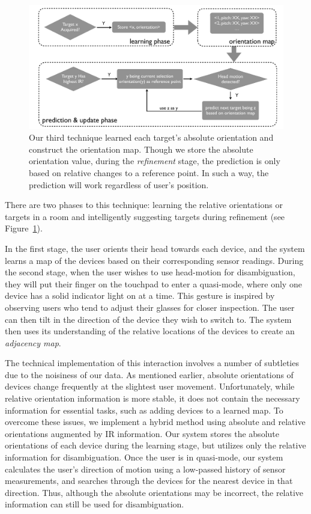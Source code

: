 \begin{figure}[t]
\centering
\includegraphics[width=1\columnwidth]{figures/third_technique3.pdf}
\caption{ Our third technique learned each target's absolute orientation and construct the orientation map. Though we store the absolute orientation value, during the {\em refinement} stage, the prediction is only based on relative changes to a reference point. In such a way, the prediction will work regardless of user's position.}
\label{fig:third_technique}
\end{figure}

There are two phases to this technique: learning the relative orientations or
targets in a room and intelligently suggesting targets during refinement (see
Figure~\ref{fig:third_technique}).

In the first stage, the user orients their head towards each device, and the
system learns a map of the devices based on their corresponding sensor readings.
During the second stage, when the user wishes to use head-motion for
disambiguation, they will put their finger on the touchpad to enter a
quasi-mode, where only one device has a solid indicator light on at a time. This
gesture is inspired by observing users who tend to adjust their glasses for
closer inspection. The user can then tilt in the direction of the device they
wish to switch to. The system then uses its understanding of the relative
locations of the devices to create an {\em adjacency map}.

The technical implementation of this interaction involves a number of subtleties
due to the noisiness of our data. As mentioned earlier, absolute orientations
of devices change frequently at the slightest user movement. Unfortunately,
while relative orientation information is more stable, it does not contain
the necessary information for essential tasks, such as adding devices to a
learned map. To overcome these issues, we implement a hybrid method using
absolute and relative orientations augmented by IR information. Our system
stores the absolute orientations of each device during the learning stage, but
utilizes only the relative information for disambiguation. Once the user is in
quasi-mode, our system calculates the user's direction of motion using a
low-passed history of sensor measurements, and searches through the devices for
the nearest device in that direction. Thus, although the absolute orientations
may be incorrect, the relative information can still be used for disambiguation.

